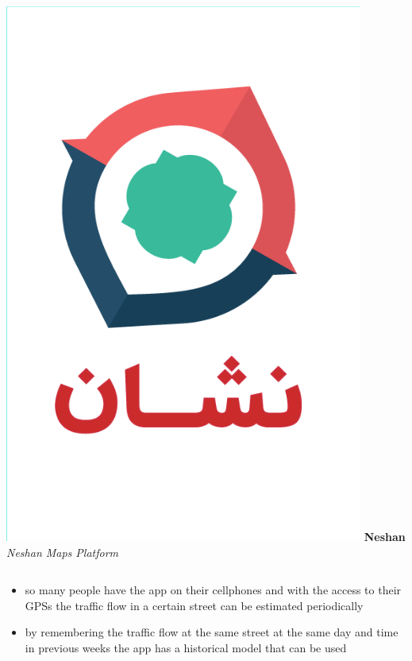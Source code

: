\documentclass{beamer}
\begin{document}
\begin{frame}
\begin{columns}
		\includegraphics[height=0.5\textheight]{./img/neshan.png}
		\textbf{Neshan}\\
		\textit{Neshan Maps Platform}
	\end{columns}
\end{frame}
\begin{frame}
  \begin{itemize}
      \item so many people have the app on their cellphones and with the access to their GPSs the traffic flow in a certain street can be estimated periodically
      \item by remembering the traffic flow at the same street at the same day and time in previous weeks the app has a historical model that can be used
  \end{itemize}
\end{frame}
\end{document}

